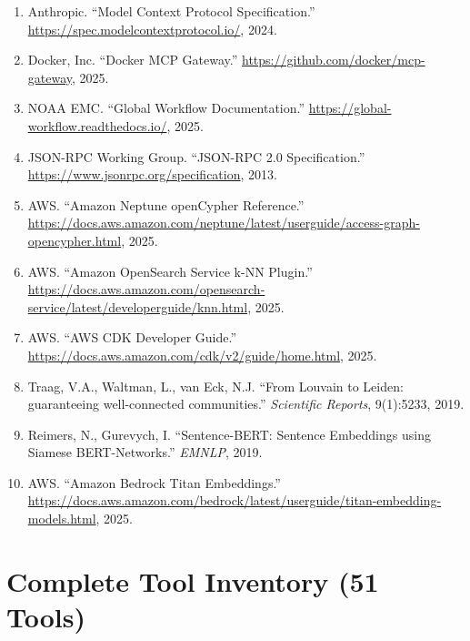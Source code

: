 \documentclass[11pt,letterpaper]{article}
\begin{document}
\begin{enumerate}[noitemsep]
    \item Anthropic. ``Model Context Protocol Specification.''
          \url{https://spec.modelcontextprotocol.io/}, 2024.
    \item Docker, Inc. ``Docker MCP Gateway.''
          \url{https://github.com/docker/mcp-gateway}, 2025.
    \item NOAA EMC. ``Global Workflow Documentation.''
          \url{https://global-workflow.readthedocs.io/}, 2025.
    \item JSON-RPC Working Group. ``JSON-RPC 2.0 Specification.''
          \url{https://www.jsonrpc.org/specification}, 2013.
    \item AWS. ``Amazon Neptune openCypher Reference.''
          \url{https://docs.aws.amazon.com/neptune/latest/userguide/access-graph-opencypher.html}, 2025.
    \item AWS. ``Amazon OpenSearch Service k-NN Plugin.''
          \url{https://docs.aws.amazon.com/opensearch-service/latest/developerguide/knn.html}, 2025.
    \item AWS. ``AWS CDK Developer Guide.''
          \url{https://docs.aws.amazon.com/cdk/v2/guide/home.html}, 2025.
    \item Traag, V.A., Waltman, L., van Eck, N.J. ``From Louvain to Leiden:
          guaranteeing well-connected communities.'' \textit{Scientific Reports},
          9(1):5233, 2019.
    \item Reimers, N., Gurevych, I. ``Sentence-BERT: Sentence Embeddings using
          Siamese BERT-Networks.'' \textit{EMNLP}, 2019.
    \item AWS. ``Amazon Bedrock Titan Embeddings.''
          \url{https://docs.aws.amazon.com/bedrock/latest/userguide/titan-embedding-models.html}, 2025.
\end{enumerate}


\appendix

\section{Complete Tool Inventory (51 Tools)}
\label{app:tools}
\end{document}
